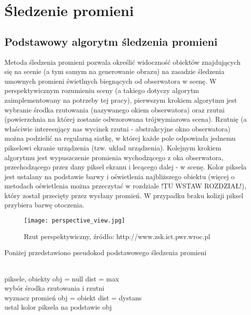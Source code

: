 \section{Śledzenie promieni}

\subsection{Podstawowy algorytm śledzenia promieni}

Metoda śledzenia promieni pozwala określić widoczność obiektów znajdujących
się na scenie (a tym samym na generowanie obrazu) na zasadzie śledzenia umownych promieni świetlnych biegnących od obserwatora w scenę. W perspektywicznym rozumieniu sceny (a takiego dotyczy algorytm zaimplementowany na potrzeby tej pracy), pierwszym krokiem algorytmu jest wybranie środka rzutowania (nazywanego okiem obserwatora) oraz rzutni (powierzchnia na której zostanie odwzorowana trójwymiarowa scena). Rzutnię (a właściwie interesujący nas wycinek rzutni - abstrakcyjne okno obserwatora) można podzielić na regularną siatkę, w której każde pole odpowiada jednemu pikselowi ekranie urządzenia (tzw. układ urządzenia). Kolejnym krokiem algorytmu jest wypuszczenie promienia wychodzącego z oka obserwatora, przechodzącego przez dany piksel ekranu i lecącego dalej - w scenę. Kolor piksela jest ustalany na podstawie barwy i oświetlenia najbliższego obiektu (więcej o metodach oświetlenia można przeczytać w rozdziale !TU WSTAW ROZDZIAŁ!), który został przecięty przez wysłany promień. W przypadku braku kolizji piksel przybiera barwę otoczenia. 

\begin{figure}[h!]
\centering
  \caption{Rzut perspektywiczny, źródło: http://www.zsk.ict.pwr.wroc.pl}
  \texttt{[image: perspective\_view.jpg]}
\end{figure}

Poniżej przedstawiono pseudokod podstawowego śledzenia promieni

\begin{algorithmic}
\\
piksele, obiekty
\State obj = null
\State dist = max
\\
\State wybór środka rzutowania i rzutni
\\
	 \State wyznacz promień
    		\State obj = obiekt
    		\State dist = dystans
     \EndIf
	 \EndFor
\EndFor
\\
\State ustal kolor piksela na podstawie obj
\\
\end{algorithmic}

